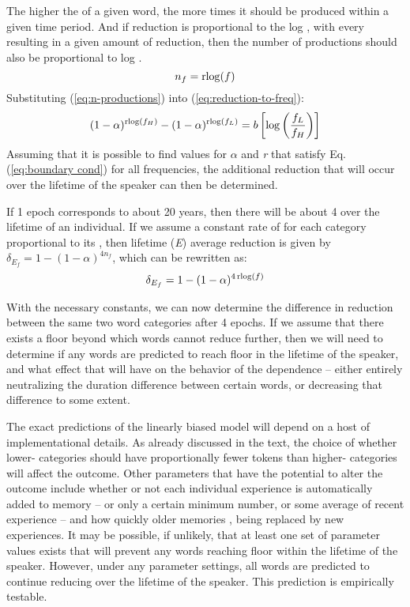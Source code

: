 The higher the  of a given word, the more times it should
be produced within a given time period. And if reduction is proportional
to the log , with every  resulting in a given amount
of reduction, then the number of productions should also be proportional
to log . 
\begin{equation}
n_{f}=\operatorname{rlog}(f)\label{eq:n-productions}
\end{equation}
Substituting (\ref{eq:n-productions}) into (\ref{eq:reduction-to-freq}):
\begin{equation}
(1-\alpha)^{\operatorname{rlog}(f_{H})}-(1-\alpha)^{\operatorname{rlog}(f_{L})}=b\left[\log\left(\frac{f_{L}}{f_{H}}\right)\right]\label{eq:boundary cond}
\end{equation}
Assuming that it is possible to find values for $\alpha$ and \emph{r}
that satisfy Eq. (\ref{eq:boundary cond}) for all frequencies, the
additional reduction that will occur over the lifetime of the speaker
can then be determined. 

If 1 epoch corresponds to about 20 years, then there will be about
4 over the lifetime of an individual. If we assume a constant rate
of  for each category proportional to its , then
lifetime (\emph{E}) average reduction is given by $\delta_{E_{f}}=1-(1-\alpha)^{4n_{f}}$,
which can be rewritten as:
\begin{equation}
\delta_{E_{f}}=1-(1-\alpha)^{4\operatorname{rlog}(f)}
\end{equation}

With the necessary constants, we can now determine the difference
in reduction between the same two word categories after 4 epochs.
If we assume that there exists a floor beyond which words cannot reduce
further, then we will need to determine if any words are predicted
to reach floor in the lifetime of the speaker, and what effect that
will have on the behavior of the  dependence – either entirely
neutralizing the duration difference between certain words, or decreasing
that difference to some extent. 

The exact predictions of the linearly biased  model will
depend on a host of implementational details. As already discussed
in the text, the choice of whether lower- categories should
have proportionally fewer tokens than higher- categories
will affect the outcome. Other parameters that have the potential
to alter the outcome include whether or not each individual experience
is automatically added to memory – or only a certain minimum number,
or some average of recent experience – and how quickly older memories
, being replaced by new experiences. It may be possible, if unlikely,
that at least one set of parameter values exists that will prevent
any words reaching floor within the lifetime of the speaker. However,
under any parameter settings, all words are predicted to continue
reducing over the lifetime of the speaker. This prediction is empirically
testable.


